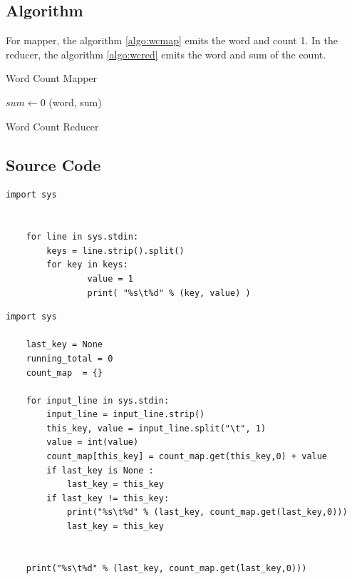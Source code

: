 \documentclass{article}
\begin{document}
\subsection{Algorithm}
For mapper, the algorithm \ref{algo:wcmap} emits the word and count 1. In the reducer, the algorithm \ref{algo:wcred} emits the word and sum of the count.
\BlankLine
\IncMargin{1em}
\begin{algorithm}
\DontPrintSemicolon
{}
\BlankLine
{}
\caption{Word Count Mapper\label{algo:wcmap}}
\end{algorithm}
\DecMargin{1em}

\IncMargin{1em}
\begin{algorithm}
\DontPrintSemicolon
{}
\BlankLine
$sum\leftarrow $0\;
\emit(word, sum)\;
\caption{Word Count Reducer\label{algo:wcred}}
\end{algorithm}
\DecMargin{1em}
\subsection{Source Code}

\begin{lstlisting}[caption={Word count mapper code},label={lst:mmmap},style=MyPythonStyle]
	import sys


	for line in sys.stdin:
		keys = line.strip().split()
		for key in keys:
	        	value = 1
	        	print( "%s\t%d" % (key, value) )

\end{lstlisting}
\BlankLine
\begin{lstlisting}[caption={Word count reducer code},label={lst:mmmap},style=MyPythonStyle]
	import sys

	last_key = None
	running_total = 0
	count_map  = {}

	for input_line in sys.stdin:
		input_line = input_line.strip()
		this_key, value = input_line.split("\t", 1)
		value = int(value)
		count_map[this_key] = count_map.get(this_key,0) + value
		if last_key is None :
			last_key = this_key
		if last_key != this_key:
			print("%s\t%d" % (last_key, count_map.get(last_key,0)))
			last_key = this_key


	print("%s\t%d" % (last_key, count_map.get(last_key,0)))
\end{lstlisting}
\end{document}
